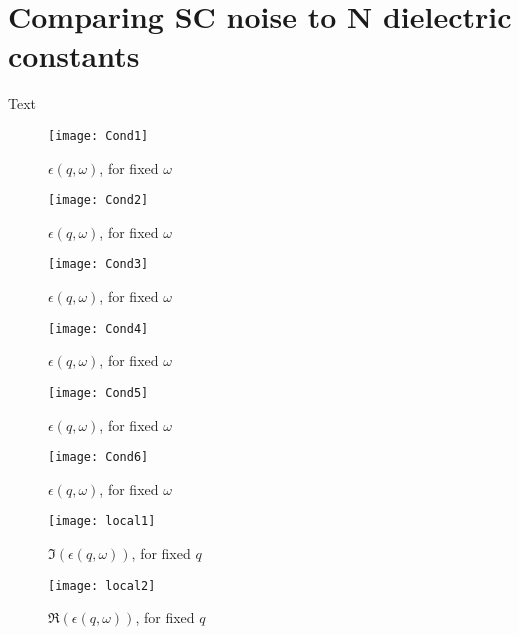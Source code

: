 \documentclass[11pt]{article}
\begin{document}
	\graphicspath{{figures/}}

	\section{Comparing SC noise to N dielectric constants} \label{sec:intro}

	Text
	\begin{figure}[htp]
		\centering
		\texttt{[image: Cond1]}
		\caption{$\epsilon(q, \omega)$, for fixed $\omega$} \label{fig:1}
	\end{figure}
	\begin{figure}[htp]
		\centering
		\texttt{[image: Cond2]}
		\caption{$\epsilon(q, \omega)$, for fixed $\omega$} \label{fig:2}
	\end{figure}
	\begin{figure}[htp]
		\centering
		\texttt{[image: Cond3]}
		\caption{$\epsilon(q, \omega)$, for fixed $\omega$} \label{fig:3}
	\end{figure}
	\begin{figure}[htp]
		\centering
		\texttt{[image: Cond4]}
		\caption{$\epsilon(q, \omega)$, for fixed $\omega$} \label{fig:4}
	\end{figure}
	\begin{figure}[htp]
		\centering
		\texttt{[image: Cond5]}
		\caption{$\epsilon(q, \omega)$, for fixed $\omega$} \label{fig:5}
	\end{figure}
	\begin{figure}[htp]
		\centering
		\texttt{[image: Cond6]}
		\caption{$\epsilon(q, \omega)$, for fixed $\omega$} \label{fig:6}
	\end{figure}

	\begin{figure}[htp]
		\centering
		\texttt{[image: local1]}
		\caption{$\Im(\epsilon(q, \omega))$, for fixed $q$} \label{fig:loc1}
	\end{figure}
	\begin{figure}[htp]
		\centering
		\texttt{[image: local2]}
		\caption{$\Re(\epsilon(q, \omega))$, for fixed $q$} \label{fig:loc2}
	\end{figure}

	\newpage
	\printbibliography
\end{document}
